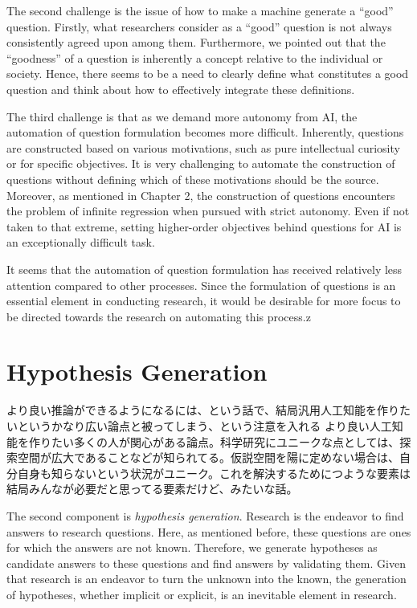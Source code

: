 The second challenge is the issue of how to make a machine generate a ``good'' question. Firstly, what researchers consider as a ``good'' question is not always consistently agreed upon among them. Furthermore, we pointed out that the ``goodness'' of a question is inherently a concept relative to the individual or society. Hence, there seems to be a need to clearly define what constitutes a good question and think about how to effectively integrate these definitions.

The third challenge is that as we demand more autonomy from AI, the automation of question formulation becomes more difficult. Inherently, questions are constructed based on various motivations, such as pure intellectual curiosity or for specific objectives. It is very challenging to automate the construction of questions without defining which of these motivations should be the source. Moreover, as mentioned in Chapter 2, the construction of questions encounters the problem of infinite regression when pursued with strict autonomy. Even if not taken to that extreme, setting higher-order objectives behind questions for AI is an exceptionally difficult task.

It seems that the automation of question formulation has received relatively less attention compared to other processes. Since the formulation of questions is an essential element in conducting research, it would be desirable for more focus to be directed towards the research on automating this process.z

\section{Hypothesis Generation}
より良い推論ができるようになるには、という話で、結局汎用人工知能を作りたいというかなり広い論点と被ってしまう、という注意を入れる
より良い人工知能を作りたい多くの人が関心がある論点。科学研究にユニークな点としては、探索空間が広大であることなどが知られてる。仮説空間を陽に定めない場合は、自分自身も知らないという状況がユニーク。これを解決するためにつような要素は結局みんなが必要だと思ってる要素だけど、みたいな話。

The second component is \textit{hypothesis generation}. Research is the endeavor to find answers to research questions. Here, as mentioned before, these questions are ones for which the answers are not known. Therefore, we generate hypotheses as candidate answers to these questions and find answers by validating them. Given that research is an endeavor to turn the unknown into the known, the generation of hypotheses, whether implicit or explicit, is an inevitable element in research.

